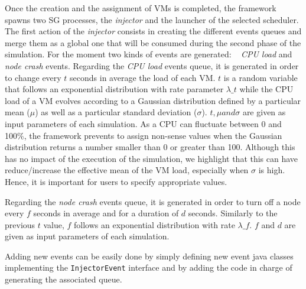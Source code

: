 \documentclass[conference]{IEEEtran}
\newcommand{\sg}{SimGrid\xspace}
\begin{document}
Once the creation and the assignment of VMs is completed, the
framework spawns two SG processes, the \emph{injector} and the
launcher of the selected scheduler.
The first action of the \emph{injector} consists in creating the
different events queues and merge them as a global one  that will be consumed during the second phase of the
simulation.  For the moment two kinds of events are generated: ~\emph{
 CPU load}
and \emph{node crash} events.
%
Regarding the \emph{CPU load} events queue, it is generated in order to change every $t$
seconds in average the load of each VM. $t$ is a random variable that
follows an exponential distribution with rate parameter $\lambda\_t$
while the
CPU load of a VM evolves according to a Gaussian distribution defined by
a particular mean ($\mu$) as well as a particular standard deviation
($\sigma$). $t, \mu and \sigma$ are given as input parameters of each
simulation.
As a CPU can fluctuate between 0 and 100\%, the framework
prevents to assign non-sense values  when the Gaussian distribution returns a
number smaller than 0 or greater than 100. Although this has no impact
of the execution of the simulation, we highlight that this can have reduce/increase the
effective mean of the VM load, especially when $\sigma$ is high.
Hence, it is important for users to specify appropriate values.

Regarding the \emph{node crash} events queue, it is generated in order to
turn off a node every $f$ seconds in average and for a duration of $d$ seconds.
Similarly to the previous $t$ value, $f$ follows an exponential
distribution with rate $\lambda\_f$. $f$ and $d$ are given as input
parameters of each simulation.

Adding new events can be easily done by simply defining new event
java classes implementing the \texttt{InjectorEvent} interface and by
adding the code in charge of generating the associated queue.
\end{document}
